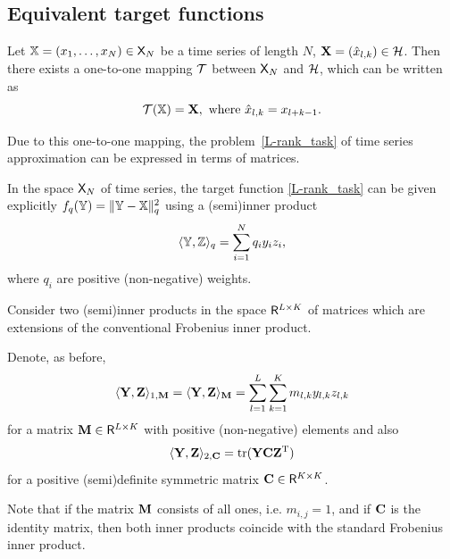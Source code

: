 \documentclass[sii]{ipart}
\DeclareMathOperator{\tr}{tr}
\begin{document}
\subsection{Equivalent target functions}

Let $\mathbb{X} = (x_1, \ldots, x_N) \in \mathsf{X}_N$ be a time series of length $N$, $\mathbf{X} = (\hat x_{l,k}) \in \mathcal{H}$. Then there exists a one-to-one mapping $\mathcal{T}$ between $\mathsf{X}_N$ and $\mathcal{H}$, which can be written as
\begin{equation*}
\calT(\tsX) = \bfX,\ \text{where} \ \hat x_{l, k} = x_{l + k - 1}.
\end{equation*}

Due to this one-to-one mapping, the problem~\eqref{L-rank_task} of time series approximation can be expressed in terms of matrices.

In the space $\mathsf{X}_N$ of time series, the target function \eqref{L-rank_task} can be given explicitly $f_q(\mathbb{Y})=\|\mathbb{Y}-\mathbb{X}\|_q^2$ using a (semi)inner product
\begin{equation}
\label{eq:norm_ser}
\langle\tsY,\tsZ\rangle_q = \sum_{i = 1}^N q_i y_i z_i,
\end{equation}
where $q_i$ are positive (non-negative) weights.

Consider two (semi)inner products in the space $\mathsf{R}^{L \times K}$ of matrices which are extensions of the conventional Frobenius inner product.

Denote, as before,
\begin{equation}
\label{eq:norm1M}
\langle\bfY,\bfZ\rangle_{1,\bfM} = \langle\bfY,\bfZ\rangle_{\bfM} = \sum_{l = 1}^L \sum_{k=1}^K m_{l,k} y_{l,k} z_{l,k}
\end{equation}
for a matrix $\mathbf{M}\in \mathsf{R}^{L\times K}$ with positive (non-negative) elements and also
\begin{equation}
\label{eq:norm2S}
\langle\bfY,\bfZ\rangle_{2,\bfC} = \tr(\bfY \bfC \bfZ^\rmT)
\end{equation}
for a positive (semi)definite symmetric matrix $\mathbf{C} \in \mathsf{R}^{K\times K}$.

Note that if the matrix $\mathbf{M}$ consists of all ones, i.e. $m_{i,j}=1$,
and if $\mathbf{C}$ is the identity matrix, then both inner products coincide with the standard Frobenius inner product.
\end{document}
